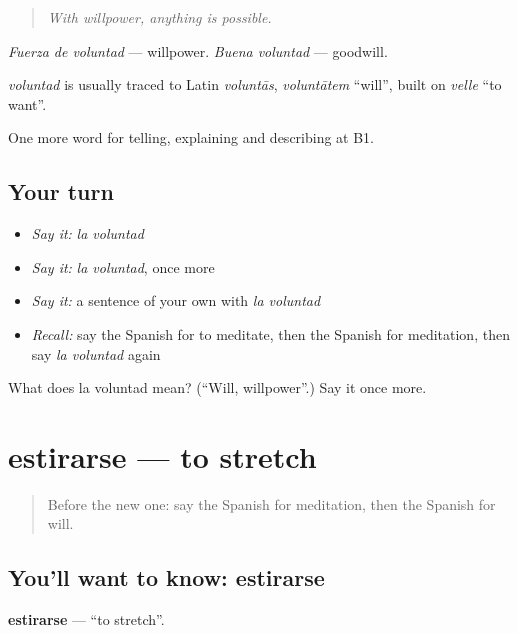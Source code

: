 \begin{quote}
\emph{With willpower, anything is possible.}
\end{quote}

\emph{Fuerza de voluntad} — willpower. \emph{Buena voluntad} — goodwill.

\begin{cousinweb}
\emph{voluntad} is usually traced to Latin \emph{voluntās}, \emph{voluntātem} \textquotedblleft{}will\textquotedblright{}, built on \emph{velle} \textquotedblleft{}to want\textquotedblright{}.
\end{cousinweb}

\begin{grammarlens}[title={What you've built}]
One more word for telling, explaining and describing at B1.
\end{grammarlens}

\subsection*{Your turn}
\begin{itemize}
\raggedright
  \item \emph{Say it:} \emph{la voluntad}
  \item \emph{Say it:} \emph{la voluntad}, once more
  \item \emph{Say it:} a sentence of your own with \emph{la voluntad}
  \item \emph{Recall:} say the Spanish for to meditate, then the Spanish for meditation, then say \emph{la voluntad} again
\end{itemize}

\begin{tcolorbox}[breakable,colback=teal!4,colframe=teal!35!black,title={Before you move on}]
What does la voluntad mean? (\textquotedblleft{}Will, willpower\textquotedblright{}.) Say it once more.
\end{tcolorbox}
\section[estirarse]{estirarse — to stretch}

\label{lesson:ES-C767-estirarse}



\begin{quote}
Before the new one: say the Spanish for meditation, then the Spanish for will.
\end{quote}

\subsection*{You'll want to know: estirarse}
\textbf{estirarse} — \textquotedblleft{}to stretch\textquotedblright{}.

